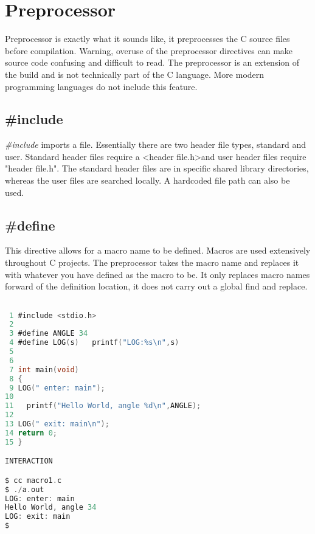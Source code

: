 \section{Preprocessor} \label{preprocessor}

Preprocessor is exactly what it sounds like, it preprocesses the C source files before compilation. Warning, overuse of the preprocessor directives can make source code confusing and difficult to read. The preprocessor is an extension of the build and is not technically part of the C language. More modern programming languages do not include this feature.

\subsection{\#include}


\textit{\#include} imports a file. Essentially there are two header file types, standard and user. Standard header files require a \textless header file.h\textgreater\space and user header files require "header file.h". The standard header files are in specific shared library directories, whereas the user files are searched locally. A hardcoded file path can also be used.

\subsection{\#define}


This directive allows for a macro name to be defined. Macros are used extensively throughout C projects. The preprocessor takes the macro name and replaces it with whatever you have defined as the macro to be. It only replaces macro names forward of the definition location, it does not carry out a global find and replace.

\begin{lstlisting}[language=C,showstringspaces=false, caption={File macro1.c, LOG macro},captionpos=b,label=macro1]

 1 #include <stdio.h>
 2 
 3 #define ANGLE 34
 4 #define LOG(s)   printf("LOG:%s\n",s)
 5 
 6 
 7 int main(void)
 8 {
 9 LOG(" enter: main");
10 
11   printf("Hello World, angle %d\n",ANGLE);
12 
13 LOG(" exit: main\n");
14 return 0;
15 }

INTERACTION

$ cc macro1.c
$ ./a.out
LOG: enter: main
Hello World, angle 34
LOG: exit: main
$

\end{lstlisting}


